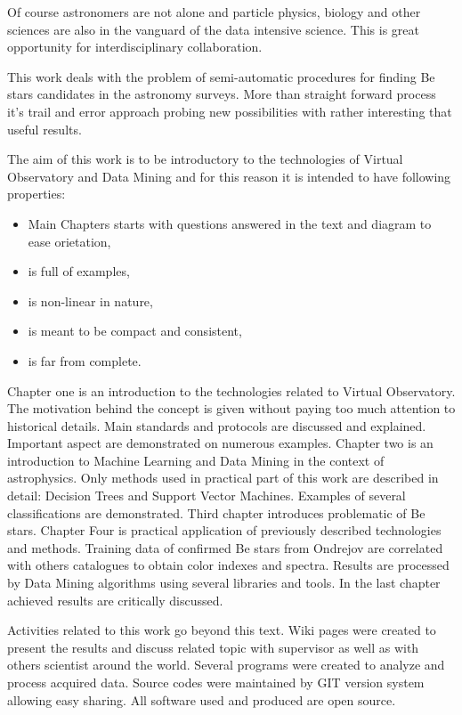 Of course astronomers are not alone and particle physics, biology and
other sciences are also in the vanguard of the data intensive
science. This is great opportunity for interdisciplinary
collaboration. 

This work deals with the problem of semi-automatic procedures for
finding Be stars candidates in the astronomy surveys. More than
straight forward process it's trail and error approach probing new
possibilities with rather interesting that useful results.

The aim of this work is to be introductory to the technologies of
Virtual Observatory and Data Mining and for this reason it is intended
to have following properties:

\begin{itemize}
\item Main Chapters starts with questions answered in the text and
  diagram to ease orietation,
\item is full of examples, 
\item is non-linear in nature,
\item is meant to be compact and consistent,
\item is far from complete.
\end{itemize}

Chapter one is an introduction to the technologies related to Virtual
Observatory. The motivation behind the concept is given without paying
too much attention to historical details. Main standards and protocols
are discussed and explained. Important aspect are demonstrated on
numerous examples. Chapter two is an introduction to Machine Learning
and Data Mining in the context of astrophysics. Only methods used in
practical part of this work are described in detail: Decision Trees
and Support Vector Machines. Examples of several classifications are
demonstrated. Third chapter introduces problematic of Be
stars. Chapter Four is practical application of previously described
technologies and methods. Training data of confirmed Be stars from
Ondrejov are correlated with others catalogues to obtain color indexes
and spectra. Results are processed by Data Mining algorithms using
several libraries and tools. In the last chapter achieved results are
critically discussed.

Activities related to this work go beyond this text. Wiki pages were
created to present the results and discuss related topic with
supervisor as well as with others scientist around the world. Several
programs were created to analyze and process acquired data. Source
codes were maintained by GIT version system allowing easy sharing. All
software used and produced are open source.








